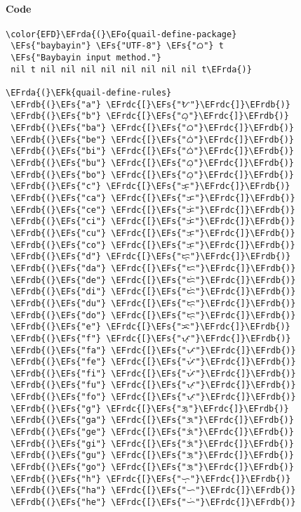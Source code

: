 \documentclass[a4wide,10pt]{article}
\newcommand{\EFs}[1]{\textcolor{EFs}{#1}} %
\newcommand{\EFk}[1]{\textcolor{EFk}{#1}} %
\newcommand{\EFo}[1]{\textcolor{EFo}{#1}} %
\newcommand{\EFrda}[1]{\textcolor{EFrda}{#1}} %
\newcommand{\EFrdb}[1]{\textcolor{EFrdb}{#1}} %
\newcommand{\EFrdc}[1]{\textcolor{EFrdc}{#1}} %
\begin{document}
\paragraph{Code}
\label{sec:orgf27ac07}
\begin{Code}
\begin{Verbatim}
\color{EFD}\EFrda{(}\EFo{quail-define-package}
 \EFs{"baybayin"} \EFs{"UTF-8"} \EFs{"ᜊ"} t
 \EFs{"Baybayin input method."}
 nil t nil nil nil nil nil nil nil nil t\EFrda{)}

\EFrda{(}\EFk{quail-define-rules}
 \EFrdb{(}\EFs{"a"} \EFrdc{[}\EFs{"ᜀ"}\EFrdc{]}\EFrdb{)}
 \EFrdb{(}\EFs{"b"} \EFrdc{[}\EFs{"ᜊ᜔"}\EFrdc{]}\EFrdb{)}
 \EFrdb{(}\EFs{"ba"} \EFrdc{[}\EFs{"ᜊ"}\EFrdc{]}\EFrdb{)}
 \EFrdb{(}\EFs{"be"} \EFrdc{[}\EFs{"ᜊᜒ"}\EFrdc{]}\EFrdb{)}
 \EFrdb{(}\EFs{"bi"} \EFrdc{[}\EFs{"ᜊᜒ"}\EFrdc{]}\EFrdb{)}
 \EFrdb{(}\EFs{"bu"} \EFrdc{[}\EFs{"ᜊᜓ"}\EFrdc{]}\EFrdb{)}
 \EFrdb{(}\EFs{"bo"} \EFrdc{[}\EFs{"ᜊᜓ"}\EFrdc{]}\EFrdb{)}
 \EFrdb{(}\EFs{"c"} \EFrdc{[}\EFs{"ᜃ᜔"}\EFrdc{]}\EFrdb{)}
 \EFrdb{(}\EFs{"ca"} \EFrdc{[}\EFs{"ᜃ"}\EFrdc{]}\EFrdb{)}
 \EFrdb{(}\EFs{"ce"} \EFrdc{[}\EFs{"ᜃᜒ"}\EFrdc{]}\EFrdb{)}
 \EFrdb{(}\EFs{"ci"} \EFrdc{[}\EFs{"ᜃᜒ"}\EFrdc{]}\EFrdb{)}
 \EFrdb{(}\EFs{"cu"} \EFrdc{[}\EFs{"ᜃᜓ"}\EFrdc{]}\EFrdb{)}
 \EFrdb{(}\EFs{"co"} \EFrdc{[}\EFs{"ᜃᜓ"}\EFrdc{]}\EFrdb{)}
 \EFrdb{(}\EFs{"d"} \EFrdc{[}\EFs{"ᜇ᜔"}\EFrdc{]}\EFrdb{)}
 \EFrdb{(}\EFs{"da"} \EFrdc{[}\EFs{"ᜇ"}\EFrdc{]}\EFrdb{)}
 \EFrdb{(}\EFs{"de"} \EFrdc{[}\EFs{"ᜇᜒ"}\EFrdc{]}\EFrdb{)}
 \EFrdb{(}\EFs{"di"} \EFrdc{[}\EFs{"ᜇᜒ"}\EFrdc{]}\EFrdb{)}
 \EFrdb{(}\EFs{"du"} \EFrdc{[}\EFs{"ᜇᜓ"}\EFrdc{]}\EFrdb{)}
 \EFrdb{(}\EFs{"do"} \EFrdc{[}\EFs{"ᜇᜓ"}\EFrdc{]}\EFrdb{)}
 \EFrdb{(}\EFs{"e"} \EFrdc{[}\EFs{"ᜁ"}\EFrdc{]}\EFrdb{)}
 \EFrdb{(}\EFs{"f"} \EFrdc{[}\EFs{"ᜉ᜔"}\EFrdc{]}\EFrdb{)}
 \EFrdb{(}\EFs{"fa"} \EFrdc{[}\EFs{"ᜉ"}\EFrdc{]}\EFrdb{)}
 \EFrdb{(}\EFs{"fe"} \EFrdc{[}\EFs{"ᜉᜒ"}\EFrdc{]}\EFrdb{)}
 \EFrdb{(}\EFs{"fi"} \EFrdc{[}\EFs{"ᜉᜒ"}\EFrdc{]}\EFrdb{)}
 \EFrdb{(}\EFs{"fu"} \EFrdc{[}\EFs{"ᜉᜓ"}\EFrdc{]}\EFrdb{)}
 \EFrdb{(}\EFs{"fo"} \EFrdc{[}\EFs{"ᜉᜓ"}\EFrdc{]}\EFrdb{)}
 \EFrdb{(}\EFs{"g"} \EFrdc{[}\EFs{"ᜄ᜔"}\EFrdc{]}\EFrdb{)}
 \EFrdb{(}\EFs{"ga"} \EFrdc{[}\EFs{"ᜄ"}\EFrdc{]}\EFrdb{)}
 \EFrdb{(}\EFs{"ge"} \EFrdc{[}\EFs{"ᜄᜒ"}\EFrdc{]}\EFrdb{)}
 \EFrdb{(}\EFs{"gi"} \EFrdc{[}\EFs{"ᜄᜒ"}\EFrdc{]}\EFrdb{)}
 \EFrdb{(}\EFs{"gu"} \EFrdc{[}\EFs{"ᜄᜓ"}\EFrdc{]}\EFrdb{)}
 \EFrdb{(}\EFs{"go"} \EFrdc{[}\EFs{"ᜄᜓ"}\EFrdc{]}\EFrdb{)}
 \EFrdb{(}\EFs{"h"} \EFrdc{[}\EFs{"ᜑ᜔"}\EFrdc{]}\EFrdb{)}
 \EFrdb{(}\EFs{"ha"} \EFrdc{[}\EFs{"ᜑ"}\EFrdc{]}\EFrdb{)}
 \EFrdb{(}\EFs{"he"} \EFrdc{[}\EFs{"ᜑᜒ"}\EFrdc{]}\EFrdb{)}

\end{Verbatim}
\end{Code}
\end{document}
